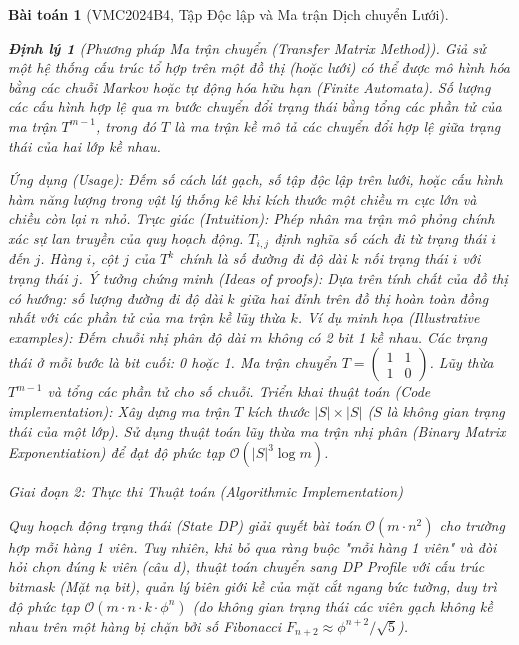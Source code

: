 \documentclass{article}
\newtheorem{baitoan}{Bài toán}
\newtheorem{dinhly}{Định lý}
\begin{document}
\begin{baitoan}[VMC2024B4, Tập Độc lập và Ma trận Dịch chuyển Lưới]
\begin{dinhly}[Phương pháp Ma trận chuyển (Transfer Matrix Method)]
    Giả sử một hệ thống cấu trúc tổ hợp trên một đồ thị (hoặc lưới) có thể được mô hình hóa bằng các chuỗi Markov hoặc tự động hóa hữu hạn (Finite Automata). Số lượng các cấu hình hợp lệ qua $m$ bước chuyển đổi trạng thái bằng tổng các phần tử của ma trận $T^{m-1}$, trong đó $T$ là ma trận kề mô tả các chuyển đổi hợp lệ giữa trạng thái của hai lớp kề nhau.
\end{dinhly}
\emph{Ứng dụng (Usage):} Đếm số cách lát gạch, số tập độc lập trên lưới, hoặc cấu hình hàm năng lượng trong vật lý thống kê khi kích thước một chiều $m$ cực lớn và chiều còn lại $n$ nhỏ.
\emph{Trực giác (Intuition):} Phép nhân ma trận mô phỏng chính xác sự lan truyền của quy hoạch động. $T_{i,j}$ định nghĩa số cách đi từ trạng thái $i$ đến $j$. Hàng $i$, cột $j$ của $T^k$ chính là số đường đi độ dài $k$ nối trạng thái $i$ với trạng thái $j$.
\emph{Ý tưởng chứng minh (Ideas of proofs):} Dựa trên tính chất của đồ thị có hướng: số lượng đường đi độ dài $k$ giữa hai đỉnh trên đồ thị hoàn toàn đồng nhất với các phần tử của ma trận kề lũy thừa $k$.
\emph{Ví dụ minh họa (Illustrative examples):} Đếm chuỗi nhị phân độ dài $m$ không có 2 bit 1 kề nhau. Các trạng thái ở mỗi bước là bit cuối: 0 hoặc 1. Ma trận chuyển $T = \begin{pmatrix} 1 & 1 \\ 1 & 0 \end{pmatrix}$. Lũy thừa $T^{m-1}$ và tổng các phần tử cho số chuỗi.
\emph{Triển khai thuật toán (Code implementation):} Xây dựng ma trận $T$ kích thước $|S| \times |S|$ ($S$ là không gian trạng thái của một lớp). Sử dụng thuật toán lũy thừa ma trận nhị phân (Binary Matrix Exponentiation) để đạt độ phức tạp $\mathcal{O}(|S|^3 \log m)$.

  
\vspace{0.5em}\noindent\emph{Giai đoạn 2: Thực thi Thuật toán (Algorithmic Implementation)}
 
 Quy hoạch động trạng thái (State DP) giải quyết bài toán $\mathcal{O}(m \cdot n^2)$ cho trường hợp mỗi hàng 1 viên. Tuy nhiên, khi bỏ qua ràng buộc "mỗi hàng 1 viên" và đòi hỏi chọn đúng $k$ viên (câu d), thuật toán chuyển sang DP Profile với cấu trúc bitmask (Mặt nạ bit), quản lý biên giới kề của mặt cắt ngang bức tường, duy trì độ phức tạp $\mathcal{O}(m \cdot n \cdot k \cdot \phi^n)$ (do không gian trạng thái các viên gạch không kề nhau trên một hàng bị chặn bởi số Fibonacci $F_{n+2} \approx \phi^{n+2}/\sqrt{5}$).


\end{baitoan}
\end{document}
